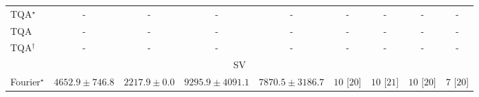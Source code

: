 \begin{tabular}{l|cccc|cccc|}
TQA$^\star$ & {\cellcolor[HTML]{000000}} \color[HTML]{F1F1F1} {\cellcolor{white}} \color{black} - & {\cellcolor[HTML]{000000}} \color[HTML]{F1F1F1} {\cellcolor{white}} \color{black} - & {\cellcolor[HTML]{000000}} \color[HTML]{F1F1F1} {\cellcolor{white}} \color{black} - & {\cellcolor[HTML]{000000}} \color[HTML]{F1F1F1} {\cellcolor{white}} \color{black} - & {\cellcolor[HTML]{000000}} \color[HTML]{F1F1F1} {\cellcolor{white}} \color{black} - & {\cellcolor[HTML]{000000}} \color[HTML]{F1F1F1} {\cellcolor{white}} \color{black} - & {\cellcolor[HTML]{000000}} \color[HTML]{F1F1F1} {\cellcolor{white}} \color{black} - & {\cellcolor[HTML]{000000}} \color[HTML]{F1F1F1} {\cellcolor{white}} \color{black} - \\
TQA & {\cellcolor[HTML]{000000}} \color[HTML]{F1F1F1} {\cellcolor{white}} \color{black} - & {\cellcolor[HTML]{000000}} \color[HTML]{F1F1F1} {\cellcolor{white}} \color{black} - & {\cellcolor[HTML]{000000}} \color[HTML]{F1F1F1} {\cellcolor{white}} \color{black} - & {\cellcolor[HTML]{000000}} \color[HTML]{F1F1F1} {\cellcolor{white}} \color{black} - & {\cellcolor[HTML]{000000}} \color[HTML]{F1F1F1} {\cellcolor{white}} \color{black} - & {\cellcolor[HTML]{000000}} \color[HTML]{F1F1F1} {\cellcolor{white}} \color{black} - & {\cellcolor[HTML]{000000}} \color[HTML]{F1F1F1} {\cellcolor{white}} \color{black} - & {\cellcolor[HTML]{000000}} \color[HTML]{F1F1F1} {\cellcolor{white}} \color{black} - \\
TQA$^\dagger$ & {\cellcolor[HTML]{000000}} \color[HTML]{F1F1F1} {\cellcolor{white}} \color{black} - & {\cellcolor[HTML]{000000}} \color[HTML]{F1F1F1} {\cellcolor{white}} \color{black} - & {\cellcolor[HTML]{000000}} \color[HTML]{F1F1F1} {\cellcolor{white}} \color{black} - & {\cellcolor[HTML]{000000}} \color[HTML]{F1F1F1} {\cellcolor{white}} \color{black} - & {\cellcolor[HTML]{000000}} \color[HTML]{F1F1F1} {\cellcolor{white}} \color{black} - & {\cellcolor[HTML]{000000}} \color[HTML]{F1F1F1} {\cellcolor{white}} \color{black} - & {\cellcolor[HTML]{000000}} \color[HTML]{F1F1F1} {\cellcolor{white}} \color{black} - & {\cellcolor[HTML]{000000}} \color[HTML]{F1F1F1} {\cellcolor{white}} \color{black} - \\
\cline{1-9}
\multicolumn{9}{c}{\rule{0pt}{8pt}SV} \\
\midrule
Fourier$^\star$ & {\cellcolor[HTML]{99B8D8}} \color[HTML]{000000} $4652.9\pm 746.8$ & {\cellcolor[HTML]{F0EAF4}} \color[HTML]{000000} $2217.9\pm 0.0$ & {\cellcolor[HTML]{023858}} \color[HTML]{F1F1F1} $9295.9\pm 4091.1$ & {\cellcolor[HTML]{04649D}} \color[HTML]{F1F1F1} $7870.5\pm 3186.7$ & {\cellcolor[HTML]{49006A}} \color[HTML]{F1F1F1} $10$ [$20$] & {\cellcolor[HTML]{49006A}} \color[HTML]{F1F1F1} $10$ [$21$] & {\cellcolor[HTML]{49006A}} \color[HTML]{F1F1F1} $10$ [$20$] & {\cellcolor[HTML]{CD238F}} \color[HTML]{F1F1F1} $7$ [$20$] \\

\end{tabular}
